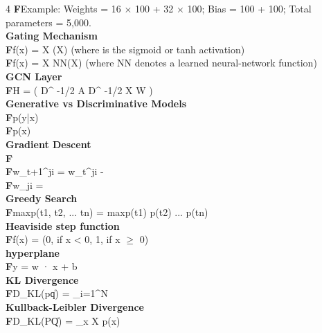 \documentclass[8pt]{extarticle}
\newcommand{\ftag}{\textcolor{formulacolor}{\tiny\textbf{F}}\;}
\begin{document}
\begin{multicols}{4}
\ftag Example: Weights = 16 $\times$ 100 + 32 $\times$ 100; Bias = 100 + 100; Total parameters = 5,000.\\
\vspace{2pt}\textbf{Gating Mechanism}\\
\ftag f(x) = X \cdot \sigma(X) (where \sigma is the sigmoid or tanh activation)\\
\ftag f(x) = X \cdot NN(X) (where NN denotes a learned neural-network function)\\
\vspace{2pt}\textbf{GCN Layer}\\
\ftag H = \sigma\big( D\textasciicircum{}{ -1/2 } A D\textasciicircum{}{ -1/2 } X W \big)\\
\vspace{2pt}\textbf{Generative vs Discriminative Models}\\
\ftag p(y|x)\\
\ftag p(x)\\
\vspace{2pt}\textbf{Gradient Descent}\\
\ftag {}\\
\ftag w\_{t+1}\textasciicircum{}{ji} = w\_{t}\textasciicircum{}{ji} - \eta {}\\
\ftag \Delta w\_{ji} = \eta {}\\
\vspace{2pt}\textbf{Greedy Search}\\
\ftag maxp(t1, t2, ... tn) = maxp(t1) \cdot p(t2) \cdot ... \cdot p(tn)\\
\vspace{2pt}\textbf{Heaviside step function}\\
\ftag f(x) = (0, if x < 0, 1, if x $\geq$ 0)\\
\vspace{2pt}\textbf{hyperplane}\\
\ftag y = w · x + b\\
\vspace{2pt}\textbf{KL Divergence}\\
\ftag D\_{KL}(p\|q) = \sum\_{i=1}\textasciicircum{}{N}\\
\vspace{2pt}\textbf{Kullback-Leibler Divergence}\\
\ftag D\_{KL}(P\|Q) = \sum\_{x \in X} p(x) \log {}\\

\end{multicols}
\end{document}
